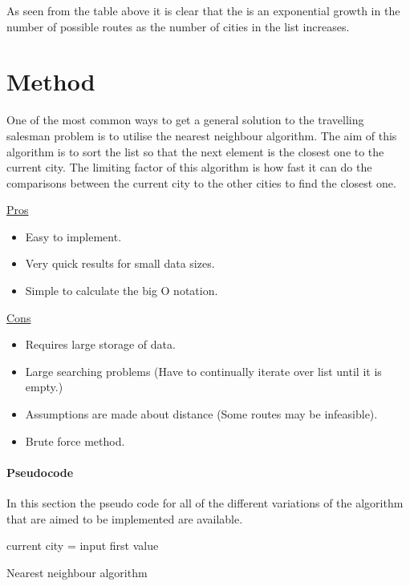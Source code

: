\documentclass[conference,backref=page]{acmsiggraph}
\begin{document}
As seen from the table above it is clear that the is an exponential growth in the number of possible routes as the number of cities in the list increases.

\section{Method}

One of the most common ways to get a general solution to the travelling salesman problem is to utilise the nearest neighbour algorithm. The aim of this algorithm is to sort the list so that the next element is the closest one to the current city. The limiting factor of this algorithm is how fast it can do the comparisons between the current city to the other cities to find the closest one.


\underline{Pros}
\begin{itemize}
	\item Easy to implement.
	\item Very quick results for small data sizes.
	\item Simple to calculate the big O notation.
	
\end{itemize}

\underline{Cons}
\begin{itemize}
	\item Requires large storage of data. 
	\item Large searching problems (Have to continually iterate over list until it is empty.)
	\item Assumptions are made about distance (Some routes may be infeasible).
	\item Brute force method.
\end{itemize}

\paragraph{Pseudocode} \hfill

In this section the pseudo code for all of the different variations of the algorithm that are aimed to be implemented are available.

	\begin{algorithm}[h]	
	current city = input first value\\
\caption{Nearest neighbour algorithm}

\end{algorithm}\hfill
\end{document}
